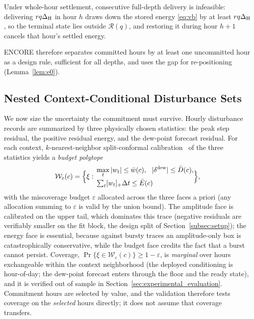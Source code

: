 \begin{proposition}\label{prop:spacing}
Under whole-hour settlement, consecutive full-depth delivery is infeasible:
delivering $rq\Delta_{\mathrm{H}}$ in hour $h$ draws down the stored energy \eqref{eq:vb} by
at least $rq\Delta_{\mathrm{H}}$, so the terminal state lies outside $\mathcal{R}(q)$, and
restoring it during hour $h{+}1$ cancels that hour's settled energy.
\end{proposition}

ENCORE therefore separates committed hours by at least one uncommitted hour
as a design rule, sufficient for all depths, and uses the gap for
re-positioning (Lemma~\ref{lem:e0}).

\subsection{Nested Context-Conditional Disturbance Sets}
\label{subsec:sets}

We now size the uncertainty the commitment must survive. Hourly disturbance
records are summarized by three physically chosen statistics: the peak step
residual, the positive residual energy, and the dew-point forecast residual.
For each context, $k$-nearest-neighbor split-conformal
calibration~\cite{lei2018distribution} of the three statistics yields a
\emph{budget polytope}
\begin{equation}
\mathcal{W}_{\varepsilon}(c)=\Bigl\{\xi:
\begin{aligned}
&\max_t |w_t| \le \bar w(c),\ \
|\delta^{\mathrm{dew}}|\le \bar D(c),\\[-1pt]
&\textstyle\sum_t [w_t]_+\Delta t \le \bar E(c)
\end{aligned}
\Bigr\},
\label{eq:box}
\end{equation}
with the miscoverage budget $\varepsilon$ allocated across the three faces a
priori (any allocation summing to $\varepsilon$ is valid by the union
bound). The amplitude face is calibrated on the upper tail, which dominates
this trace (negative residuals are verifiably smaller on the fit block, the
design split of Section~\ref{subsec:setup}); the
energy face is essential, because against bursty traces an amplitude-only
box is catastrophically conservative, while the budget face credits the fact
that a burst cannot persist. Coverage,
$\Pr\{\xi\in\mathcal{W}_\varepsilon(c)\}\ge 1-\varepsilon$, is
\emph{marginal} over hours exchangeable within the context neighborhood (the
deployed conditioning is hour-of-day; the dew-point forecast enters through
the floor and the ready state), and it is verified out of sample in
Section~\ref{sec:experimental_evaluation}. Commitment hours are selected by
value, and the validation therefore tests coverage on the \emph{selected}
hours directly; it does not assume that coverage transfers.

